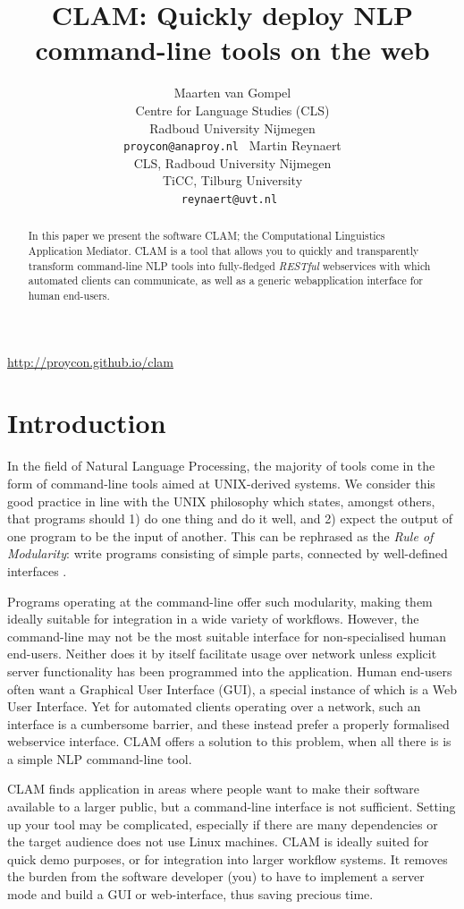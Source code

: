 \documentclass[11pt]{article}
\title{CLAM: Quickly deploy NLP command-line tools on the web}
\author{Maarten van Gompel \\ 
  Centre for Language Studies (CLS) \\
  Radboud University Nijmegen \\
  {\tt proycon@anaproy.nl } \And 
  Martin Reynaert \\
  CLS, Radboud University Nijmegen \\
  TiCC, Tilburg University  \\
  {\tt reynaert@uvt.nl } 
  }
\begin{document}
\maketitle

\begin{center}
\url{http://proycon.github.io/clam}
\bigskip
\end{center}


\begin{abstract}
In this paper we present the software CLAM; the Computational Linguistics
Application Mediator. CLAM is a tool that allows you to quickly and
transparently transform command-line NLP tools into fully-fledged
\emph{RESTful}\/ webservices with which automated clients can communicate, as
well as a generic webapplication interface for human end-users.
\end{abstract}


\section{Introduction}

In the field of Natural Language Processing, the majority of tools come in the
form of command-line tools aimed at UNIX-derived systems. We consider this good
practice in line with the UNIX philosophy \cite{unixphilo} which states,
amongst others, that programs should 1) do one thing and do it well, and 2) expect the output of one
program to be the input of another. This can be rephrased as the \emph{Rule of
Modularity}: write programs consisting of simple parts, connected by
well-defined interfaces \cite{RAYMOND2004}.

Programs operating at the command-line
offer such modularity, making them ideally suitable for integration in a
wide variety of workflows. However, the command-line may not be the most suitable interface for non-specialised
human end-users. Neither does it by itself facilitate usage over network unless
explicit server functionality has been programmed into the application.
Human end-users often want a Graphical User Interface (GUI), a special instance of which
is a Web User Interface. Yet for automated clients operating over a network, such an interface is a
cumbersome barrier, and these instead prefer a properly formalised webservice
interface. CLAM offers a solution to this problem, when all there is is a
simple NLP command-line tool.

CLAM finds application in areas where people want to make their software
available to a larger public, but a command-line interface is not sufficient.
Setting up your tool may be complicated, especially if there are many
dependencies or the target audience does not use Linux machines. CLAM is
ideally suited for quick demo purposes, or for integration into larger workflow
systems. It removes the burden from the software developer (you) to have to
implement a server mode and build a GUI or web-interface, thus saving precious
time.
\end{document}
